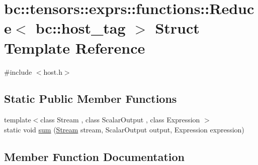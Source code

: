 \hypertarget{structbc_1_1tensors_1_1exprs_1_1functions_1_1Reduce_3_01bc_1_1host__tag_01_4}{}\section{bc\+:\+:tensors\+:\+:exprs\+:\+:functions\+:\+:Reduce$<$ bc\+:\+:host\+\_\+tag $>$ Struct Template Reference}
\label{structbc_1_1tensors_1_1exprs_1_1functions_1_1Reduce_3_01bc_1_1host__tag_01_4}


{\ttfamily \#include $<$host.\+h$>$}

\subsection*{Static Public Member Functions}
\begin{DoxyCompactItemize}
\item 
{\footnotesize template$<$class Stream , class Scalar\+Output , class Expression $>$ }\\static void \hyperlink{structbc_1_1tensors_1_1exprs_1_1functions_1_1Reduce_3_01bc_1_1host__tag_01_4_a4ae755f652ff9f52480a9e620987eab4}{sum} (\hyperlink{classbc_1_1streams_1_1Stream}{Stream} stream, Scalar\+Output output, Expression expression)
\end{DoxyCompactItemize}


\subsection{Member Function Documentation}
\mbox{\label{structbc_1_1tensors_1_1exprs_1_1functions_1_1Reduce_3_01bc_1_1host__tag_01_4_a4ae755f652ff9f52480a9e620987eab4}} 
